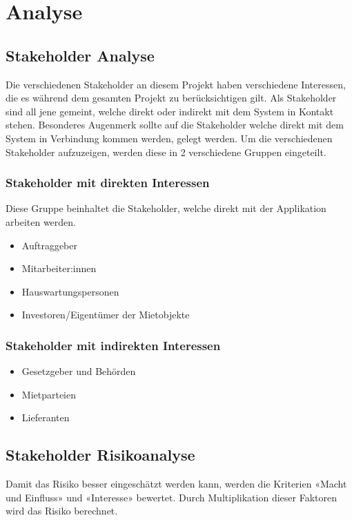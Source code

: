 



\section{Analyse}
\subsection{Stakeholder Analyse}
Die verschiedenen Stakeholder an diesem Projekt haben verschiedene Interessen, die es während dem gesamten Projekt zu berücksichtigen gilt. Als Stakeholder sind all jene gemeint, welche direkt oder indirekt mit dem System in Kontakt stehen. Besonderes Augenmerk sollte auf die Stakeholder welche direkt mit dem System in Verbindung kommen werden, gelegt werden.
Um die verschiedenen Stakeholder aufzuzeigen, werden diese in 2 verschiedene Gruppen eingeteilt.

\subsubsection{Stakeholder mit direkten Interessen}
Diese Gruppe beinhaltet die Stakeholder, welche direkt mit der Applikation arbeiten werden.

\begin{itemize}
  \item Auftraggeber
  \item Mitarbeiter:innen
  \item Hauswartungspersonen
  \item Investoren/Eigentümer der Mietobjekte
\end{itemize}

\subsubsection{Stakeholder mit indirekten Interessen}

\begin{itemize}
  \item Gesetzgeber und Behörden
  \item Mietparteien
  \item Lieferanten
\end{itemize}

\subsection{Stakeholder Risikoanalyse}
Damit das Risiko besser eingeschätzt werden kann, werden die Kriterien «Macht und Einfluss» und «Interesse» bewertet. Durch Multiplikation dieser Faktoren wird das Risiko berechnet.

